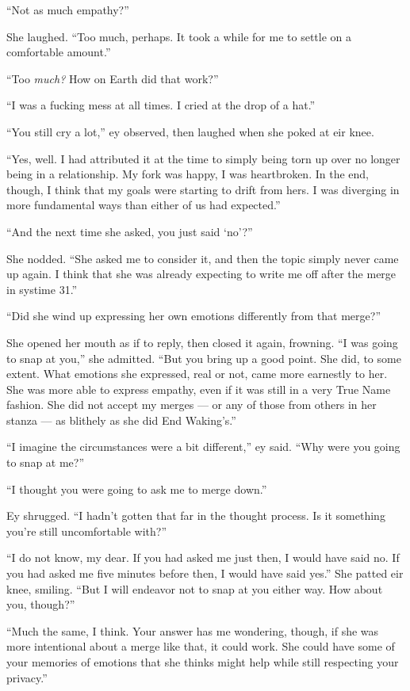 ``Not as much empathy?''

She laughed. ``Too much, perhaps. It took a while for me to settle on a comfortable amount.''

``Too \emph{much?} How on Earth did that work?''

``I was a fucking mess at all times. I cried at the drop of a hat.''

``You still cry a lot,'' ey observed, then laughed when she poked at eir knee.

``Yes, well. I had attributed it at the time to simply being torn up over no longer being in a relationship. My fork was happy, I was heartbroken. In the end, though, I think that my goals were starting to drift from hers. I was diverging in more fundamental ways than either of us had expected.''

``And the next time she asked, you just said `no'?''

She nodded. ``She asked me to consider it, and then the topic simply never came up again. I think that she was already expecting to write me off after the merge in systime 31.''

``Did she wind up expressing her own emotions differently from that merge?''

She opened her mouth as if to reply, then closed it again, frowning. ``I was going to snap at you,'' she admitted. ``But you bring up a good point. She did, to some extent. What emotions she expressed, real or not, came more earnestly to her. She was more able to express empathy, even if it was still in a very True Name fashion. She did not accept my merges — or any of those from others in her stanza — as blithely as she did End Waking's.''

``I imagine the circumstances were a bit different,'' ey said. ``Why were you going to snap at me?''

``I thought you were going to ask me to merge down.''

Ey shrugged. ``I hadn't gotten that far in the thought process. Is it something you're still uncomfortable with?''

``I do not know, my dear. If you had asked me just then, I would have said no. If you had asked me five minutes before then, I would have said yes.'' She patted eir knee, smiling. ``But I will endeavor not to snap at you either way. How about you, though?''

``Much the same, I think. Your answer has me wondering, though, if she was more intentional about a merge like that, it could work. She could have some of your memories of emotions that she thinks might help while still respecting your privacy.''

